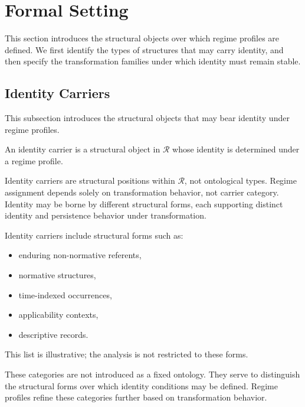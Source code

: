 
\section{Formal Setting}
\label{sec:formal_setting}

This section introduces the structural objects over which regime profiles are defined.
We first identify the types of structures that may carry identity,
and then specify the transformation families under which identity must remain stable.

\subsection{Identity Carriers}
\label{subsec:identity_carriers}

This subsection introduces the structural objects
that may bear identity under regime profiles.

\begin{definition}
\label{def:identity_carrier}
An identity carrier is a structural object in $\mathcal{R}$
whose identity is determined under a regime profile.
\end{definition}


Identity carriers are structural positions within $\mathcal{R}$,
not ontological types.
Regime assignment depends solely on transformation behavior,
not carrier category.
Identity may be borne by different structural forms,
each supporting distinct identity and persistence behavior under transformation.


\begin{example}
\label{ex:carrier_types}
Identity carriers include structural forms such as:
\begin{itemize}
\item enduring non-normative referents,
\item normative structures,
\item time-indexed occurrences,
\item applicability contexts,
\item descriptive records.
\end{itemize}
\end{example}

This list is illustrative; the analysis is not restricted to these forms.

These categories are not introduced as a fixed ontology.
They serve to distinguish the structural forms over which identity conditions
may be defined. Regime profiles refine these categories further
based on transformation behavior.


